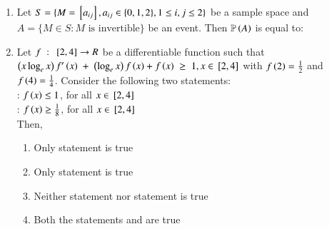 \documentclass[journal,,12pt,onecolumn]{IEEEtran}
\theoremstyle{remark}
\begin{document}
\begin{enumerate}
\begin{enumerate}
        \end{enumerate}
        \bigskip
    \item Let $S=\{M={}\left[a_{ij}\right],a_{ij} \in \{0,1,2\},1 \le i,j \le 2\}$ be a sample space and $A=\{M \in S : M\text{ is invertible}\}$ be an event. Then $\mathbb{P}\left(A\right)$ is equal to:
    \begin{enumerate}
        \end{enumerate}
\bigskip
 
 \item Let $f\;:\;{}\left[2,4\right] \rightarrow R$ be a differentiable function such that $\left(x\log_{e}{x}\right)f'\left(x\right)\;+\;\left(\log_{e}{x}\right)f\left(x\right)+f\left(x\right)\; \ge \; 1, x\in {}\left[2,4\right] $ with $f\left(2\right)=\frac{1}{2}$ and $f\left(4\right)=\frac{1}{4}$. Consider the following two statements: \\
  : $f\left(x\right)\le 1$, for all $x \in {}\left[2,4\right]$ \\
  : $f\left(x\right)\ge \frac{1}{8}$, for all $x \in {}\left[2,4\right]$\\
 Then,
 \begin{enumerate}
     \item Only statement  is true
     \item Only statement  is true 
     \item Neither statement  nor statement  is true
     \item Both the statements  and  are true 
 \end{enumerate}
 

\end{enumerate}
\end{document}
